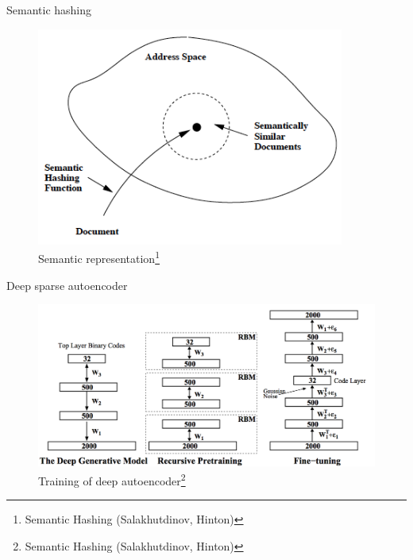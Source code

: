 \documentclass{beamer}
\begin{document}
\begin{frame}{Semantic hashing}

\begin{figure}[h!]
  \centering
  \includegraphics[width=0.9\textwidth]{images/sh_schema.png}
  \caption{Semantic representation\footnote{Semantic Hashing (Salakhutdinov, Hinton)}}
\end{figure}

\end{frame}


\begin{frame}{Deep sparse autoencoder}

\begin{figure}[h!]
  \centering
  \includegraphics[width=1\textwidth]{images/dae.png}
  \caption{Training of deep autoencoder\footnote{Semantic Hashing (Salakhutdinov, Hinton)}}
\end{figure}

\end{frame}
\end{document}
